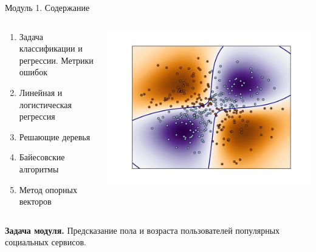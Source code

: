 \documentclass[10pt,a4paper]{beamer}
\begin{document}
\begin{frame}{Модуль 1. Содержание}

 \begin{columns}[T]
    \begin{column}{.4\textwidth}
     \begin{block}{}
     	\begin{footnotesize}
     		\begin{enumerate}
     		\item Задача классификации и регрессии. Метрики ошибок
			\item Линейная и логистическая регрессия
			\item Решающие деревья
			\item Байесовские алгоритмы
			\item Метод опорных векторов    		
     		\end{enumerate}     				
     	\end{footnotesize}
    \end{block}
    \end{column}
    \begin{column}{.55\textwidth}
    \begin{block}{}
    \vspace{-3em}
	\begin{center}
   		\includegraphics[scale=0.3]{images/svm.png}
    \end{center}
    \end{block}
    \end{column}
  \end{columns}
  
  {\bf Задача модуля.} Предсказание пола и возраста пользователей популярных социальных сервисов.

\end{frame}
\end{document}
